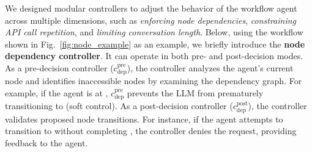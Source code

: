 We designed modular controllers to adjust the behavior of the workflow agent across multiple dimensions, such as \emph{enforcing node dependencies}, \emph{constraining API call repetition}, and \emph{limiting conversation length}. 
Below, using the workflow shown in Fig.~\ref{fig:node_example} as an example, we briefly introduce the \textbf{node dependency controller}.
It can operate in both pre- and post-decision modes. As a pre-decision controller ($c^{\text{pre}}_{\text{dep}}$), the controller analyzes the agent's current node and identifies inaccessible nodes by examining the dependency graph. For example, if the agent is at , $c^{\text{pre}}_{\text{dep}}$ prevents the LLM from prematurely transitioning to  (soft control). As a post-decision controller ($c^{\text{post}}_{\text{dep}}$), the controller validates proposed node transitions.  For instance, if the agent attempts to transition to  without completing , the controller denies the request, providing feedback to the agent.
